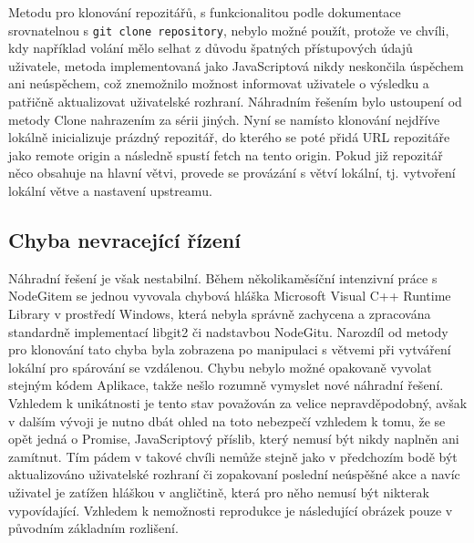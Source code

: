 Metodu pro klonování repozitářů, s funkcionalitou podle dokumentace srovnatelnou s \texttt{git clone repository}, nebylo možné použít, protože ve chvíli, kdy například volání mělo selhat z důvodu špatných přístupových údajů uživatele, metoda implementovaná jako JavaScriptová  nikdy neskončila úspěchem ani neúspěchem, což znemožnilo možnost informovat uživatele o výsledku a patřičně aktualizovat uživatelské rozhraní. Náhradním řešením bylo ustoupení od metody Clone nahrazením za sérii jiných. Nyní se namísto klonování nejdříve lokálně inicializuje prázdný repozitář, do kterého se poté přidá URL repozitáře jako remote origin a následně spustí fetch na tento origin. Pokud již repozitář něco obsahuje na hlavní větvi, provede se provázání s větví lokální, tj. vytvoření lokální větve a nastavení upstreamu.

\subsection{Chyba nevracející řízení}

Náhradní řešení je však nestabilní. Během několikaměsíční intenzivní práce s NodeGitem se jednou vyvovala chybová hláška Microsoft Visual C++ Runtime Library v prostředí Windows, která nebyla správně zachycena a zpracována standardně implementací libgit2 či nadstavbou NodeGitu. Narozdíl od metody pro klonování tato chyba byla zobrazena po manipulaci s větvemi při vytváření lokální pro spárování se vzdálenou. Chybu nebylo možné opakovaně vyvolat stejným kódem Aplikace, takže nešlo rozumně vymyslet nové náhradní řešení. Vzhledem k unikátnosti je tento stav považován za velice nepravděpodobný, avšak v dalším vývoji je nutno dbát ohled na toto nebezpečí vzhledem k tomu, že se opět jedná o Promise, JavaScriptový příslib, který nemusí být nikdy naplněn ani zamítnut. Tím pádem v takové chvíli nemůže stejně jako v předchozím bodě být aktualizováno uživatelské rozhraní či zopakovaní poslední neúspěšné akce a navíc uživatel je zatížen hláškou v angličtině, která pro něho nemusí být nikterak vypovídající. Vzhledem k nemožnosti reprodukce je následující obrázek pouze v původním základním rozlišení.

